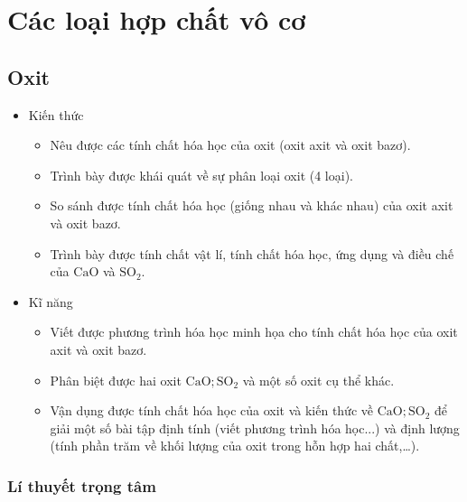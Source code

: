 \chapter{Các loại hợp chất vô cơ}
\section{Oxit}
\begin{mtbh}
	\begin{itemize}
		\item Kiến thức
		\begin{itemize}
			\item Nêu được các tính chất hóa học của oxit (oxit axit và oxit bazơ).
			\item Trình bày được khái quát về sự phân loại oxit (4 loại).
			\item So sánh được tính chất hóa học (giống nhau và khác nhau) của oxit axit và oxit bazơ.
			\item Trình bày được tính chất vật lí, tính chất hóa học, ứng dụng và điều chế của $\mathrm{CaO}$ và $\mathrm{SO}_2$.
		\end{itemize}
		\item Kĩ năng
		\begin{itemize}
			\item Viết được phương trình hóa học minh họa cho tính chất hóa học của oxit axit và oxit bazơ. 
			\item Phân biệt được hai oxit $\mathrm{CaO} ; \mathrm{SO}_2$ và một số oxit cụ thể khác.
			\item Vận dụng được tính chất hóa học của oxit và kiến thức về $\mathrm{CaO} ; \mathrm{SO}_2$ để giải một số bài tập định tính (viết phương trình hóa học...) và định lượng (tính phần trăm về khối lượng của oxit trong hỗn hợp hai chất,\ldots).
		\end{itemize}
	\end{itemize}
\end{mtbh}
\subsection{Lí thuyết trọng tâm}
